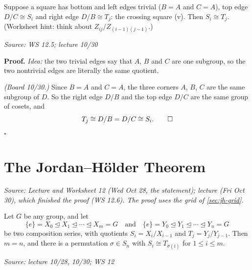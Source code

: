 \documentclass[11pt]{report}
\renewenvironment{proof}[1][Proof]{\noindent\textbf{#1.} }{\hfill$\square$\par\vspace{5pt}}
\newcommand{\srcline}[1]{\par\hfill{\footnotesize\textit{Source: #1}}}
\begin{document}
\begin{propbox}\label{prop:jh-crossing-square}
Suppose a square has bottom and left edges trivial ($B = A$ and $C = A$), top edge $D/C \cong S_i$ and right edge $D/B \cong T_j$: the crossing square (v). Then $S_i \cong T_j$. (Worksheet hint: think about $Z_{ij}/Z_{(i-1)(j-1)}$.)
\srcline{WS 12.5; lecture 10/30}
\end{propbox}

\begin{proof}
\textit{Idea:} the two trivial edges say that $A$, $B$ and $C$ are one subgroup, so the two nontrivial edges are literally the same quotient.\par
\textit{(Board 10/30.)} Since $B = A$ and $C = A$, the three corners $A$, $B$, $C$ are the same subgroup of $D$. So the right edge $D/B$ and the top edge $D/C$ are the same group of cosets, and
\[ T_j \cong D/B = D/C \cong S_i. \qedhere \]
\end{proof}

\section{The Jordan--H\"older Theorem}\label{sec:jordan-holder}

\textit{Source: Lecture and Worksheet 12 (Wed Oct 28, the statement); lecture (Fri Oct 30), which finished the proof (WS 12.6). The proof uses the grid of \ref{sec:jh-grid}.}

\begin{thmbox}\label{thm:jordan-holder}
Let $G$ be any group, and let
\[ \{e\} = X_0 \trianglelefteq X_1 \trianglelefteq \cdots \trianglelefteq X_m = G \quad\text{and}\quad \{e\} = Y_0 \trianglelefteq Y_1 \trianglelefteq \cdots \trianglelefteq Y_n = G \]
be two composition series, with quotients $S_i = X_i/X_{i-1}$ and $T_j = Y_j/Y_{j-1}$. Then $m = n$, and there is a permutation $\sigma \in S_n$ with $S_i \cong T_{\sigma(i)}$ for $1 \leq i \leq m$.
\srcline{lecture 10/28, 10/30; WS 12}
\end{thmbox}
\end{document}
